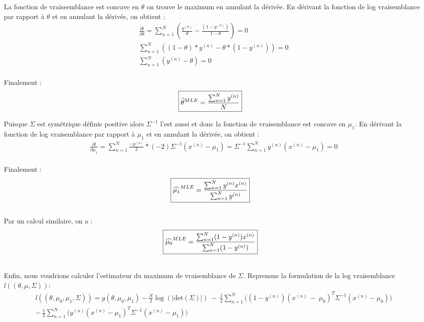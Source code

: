 \documentclass{article}
\begin{document}
\begin{enumerate}
\begin{enumerate}[label=(\alph*)]
La fonction de vraissemblance est concave en $\theta$ on trouve le maximum en annulant la dérivée. En dérivant la fonction de log vraisemblance par rapport à $\theta$ et en annulant la dérivée, on obtient :
\begin{align*}
\frac{\partial l}{\partial \theta}=\sum_{n=1}^{N}(\frac{y^{(n)}}{\theta}-\frac{(1-y^{(n)})}{1-\theta})=0
\\\sum_{n=1}^{N}((1-\theta)*y^{(n)} - \theta*(1-y^{(n)})) =0
\\\sum_{n=1}^{N}(y^{(n)}-\theta)=0
\end{align*}
\\Finalement : 
\begin{align*} 
\Aboxed{\widehat{\theta}^{MLE}=\frac{\sum_{n=1}^{N}{y^{(n)}}}{N}}
\end{align*}

Puisque $\Sigma$ est symétrique définie positive alors $\Sigma^{-1}$ l'est aussi et donc la fonction de vraisemblance est concave en $\mu_1$. En dérivant la fonction de log vraisemblance par rapport à $\mu_1$ et en annulant la dérivée, on obtient :
\begin{align*}
\frac{\partial l}{\partial \mu_1} = \sum_{n=1}^{N}\frac{-y^{(n)}}{2}*(-2)\Sigma^{-1}(x^{(n)}-\mu_1)=\Sigma^{-1}\sum_{n=1}^{N}y^{(n)}(x^{(n)}-\mu_1)=0
\end{align*}
\\Finalement : 
\begin{align*} 
\Aboxed{\widehat{\mu_1}^{MLE}=\frac{\sum_{n=1}^{N}y^{(n)}x^{(n)}}{\sum_{n=1}^{N}y^{(n)}}}
\end{align*}
\\Par un calcul similaire, on a :
\begin{align*} 
\Aboxed{\widehat{\mu_0}^{MLE}=\frac{\sum_{n=1}^{N}(1-y^{(n)})x^{(n)}}{\sum_{n=1}^{N}(1-y^{(n)})}}
\end{align*}

\\Enfin, nous voudrions calculer l'estimateur du maximum de vraisemblance de $\Sigma$. Reprenons la formulation de la log vraisemblance $l((\theta,\mu,\Sigma))$:
\begin{multline*}
l((\theta,\mu_0,\mu_1,\Sigma)) = g(\theta,\mu_0,\mu_1) - \frac{N}{2}\log(|\textrm{det}(\Sigma)|)\ - \ \frac{1}{2}\sum_{n=1}^{N}\bigg((1-y^{(n)})(x^{(n)} \ - \ \mu_0)^{T}  \Sigma^{-1}(x^{(n)} - \mu_0)\bigg)  \\ -\  \frac{1}{2}\sum_{n=1}^{N}\bigg(y^{(n)}(x^{(n)} - \mu_1)^{T} \Sigma^{-1}(x^{(n)} - \mu_1)\bigg) \\
\end{multline*}


\end{enumerate}
\end{enumerate}
\end{document}

